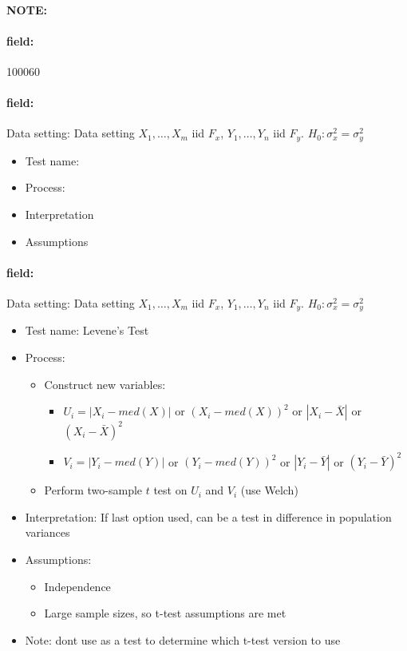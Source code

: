 \documentclass[12pt]{article}
\newenvironment{note}{\paragraph{NOTE:}}{}
\newenvironment{field}{\paragraph{field:}}{}
\begin{document}
\begin{note} \begin{field} \tiny 100060 \end{field}
 \begin{field}
  Data setting: Data setting $X_1, \ldots , X_m$ iid $F_x$, $Y_1, \ldots, Y_n$ iid $F_y$. $H_0: \sigma_x^2 = \sigma_y^2$
  \begin{itemize}
   \item Test name:
   \item Process:
   \item Interpretation
   \item Assumptions
  \end{itemize}
 \end{field}
 \begin{field}
  Data setting: Data setting $X_1, \ldots , X_m$ iid $F_x$, $Y_1, \ldots, Y_n$ iid $F_y$. $H_0: \sigma_x^2 = \sigma_y^2$
  \begin{itemize}
   \item Test name: Levene's Test
   \item Process:
         \begin{itemize}
          \item Construct new variables:
                \begin{itemize}
                 \item $U_i = |X_i - med(X)|$ or $(X_i - med(X))^2$ or $|X_i - \bar{X}|$ or $(X_i - \bar{X})^2$
                 \item $V_i = |Y_i - med(Y)|$ or $(Y_i - med(Y))^2$ or $|Y_i - \bar{Y}|$ or $(Y_i - \bar{Y})^2$
                \end{itemize}
          \item Perform two-sample $t$ test on $U_i$ and $V_i$ (use Welch)
         \end{itemize}
   \item Interpretation: If last option used, can be a test in difference in population variances
   \item Assumptions:
         \begin{itemize}
          \item Independence
          \item Large sample sizes, so t-test assumptions are met
         \end{itemize}
   \item Note: dont use as a test to determine which t-test version to use
  \end{itemize}
 \end{field}
\end{note}
\end{document}
